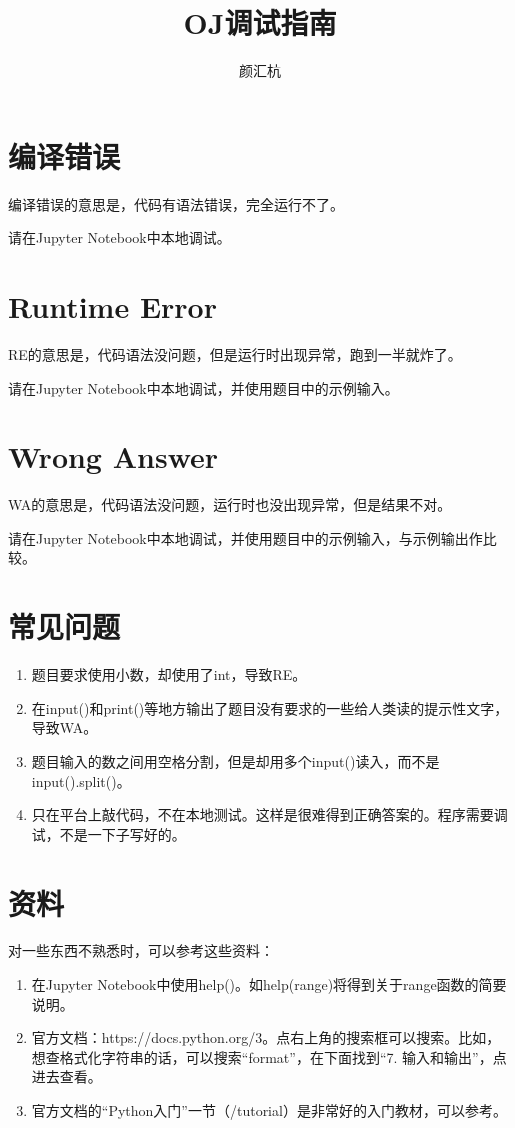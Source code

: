 \documentclass[twocolumn, a5paper]{article}
\title{OJ调试指南}
\author{颜汇杭}
\begin{document}
\maketitle	
\thispagestyle{empty}

\section{编译错误}

编译错误的意思是，代码有语法错误，完全运行不了。

请在Jupyter Notebook中本地调试。

\section{Runtime Error}

RE的意思是，代码语法没问题，但是运行时出现异常，跑到一半就炸了。

请在Jupyter Notebook中本地调试，并使用题目中的示例输入。

\section{Wrong Answer}

WA的意思是，代码语法没问题，运行时也没出现异常，但是结果不对。

请在Jupyter
Notebook中本地调试，并使用题目中的示例输入，与示例输出作比较。

\section{常见问题}

\begin{enumerate}
	\item 题目要求使用小数，却使用了int，导致RE。
	\item
			在input()和print()等地方输出了题目没有要求的一些给人类读的提示性文字，导致WA。
	\item
			题目输入的数之间用空格分割，但是却用多个input()读入，而不是input().split()。
	\item
			只在平台上敲代码，不在本地测试。这样是很难得到正确答案的。程序需要调试，不是一下子写好的。
\end{enumerate}

\section{资料}

对一些东西不熟悉时，可以参考这些资料：

\begin{enumerate}
		\item 在Jupyter
				Notebook中使用help()。如help(range)将得到关于range函数的简要说明。
				\item
						官方文档：https://docs.python.org/3。点右上角的搜索框可以搜索。比如，想查格式化字符串的话，可以搜索“format”，在下面找到“7.
						输入和输出”，点进去查看。
				\item
						官方文档的“Python入门”一节（/tutorial）是非常好的入门教材，可以参考。
\end{enumerate}
\end{document}
